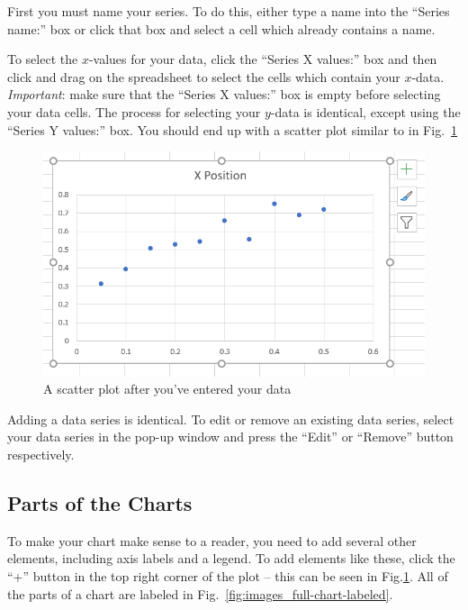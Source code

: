 \documentclass[10pt]{article}
\begin{document}
First you must name your series.
To do this, either type a name into the ``Series name:'' box or click that box and select a cell which already contains a name.

To select the $x$-values for your data, click the ``Series X values:''  box and then click and drag on the spreadsheet to select the cells which contain your $x$-data.
\textit{Important}: make sure that the ``Series X values:'' box is empty before selecting your data cells.
The process for selecting your $y$-data is identical, except using the ``Series Y values:'' box.
You should end up with a scatter plot similar to in Fig.~\ref{fig:images_plain-chart}

\begin{figure}[htpb]
	\centering
	\includegraphics[width=0.8\linewidth]{images/plain-chart.png}
	\caption{A scatter plot after you've entered your data}%
	\label{fig:images_plain-chart}
\end{figure}

Adding a data series is identical.
To edit or remove an existing data series, select your data series in the pop-up window and press the ``Edit'' or ``Remove'' button respectively.

\subsection{Parts of the Charts}%
\label{sub:parts_of_the_charts}

To make your chart make sense to a reader, you need to add several other elements, including axis labels and a legend.
To add elements like these, click the ``+'' button in the top right corner of the plot -- this can be seen in Fig.\ref{fig:images_plain-chart}.
All of the parts of a chart are labeled in Fig.~\ref{fig:images_full-chart-labeled}. 
\end{document}
